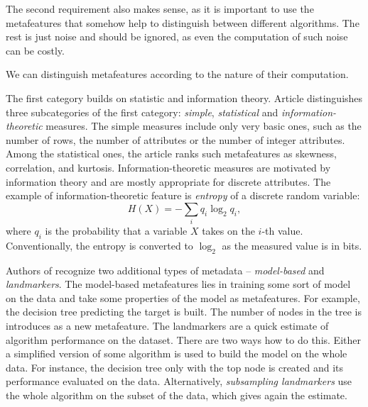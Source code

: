 The second requirement also makes sense, as it is important to use the metafeatures that somehow help to distinguish between different algorithms. The rest is just noise and should be ignored, as even the computation of such noise can be costly.

We can distinguish metafeatures according to the nature of their computation.

The first category builds on statistic and information theory. Article \cite{MethodsForComparisonHenery1994} distinguishes three subcategories of the first category: \emph{simple}, \emph{statistical} and \emph{information-theoretic} measures. The simple measures include only very basic ones, such as the number of rows, the number of attributes or the number of integer attributes. 
Among the statistical ones, the article ranks such metafeatures as skewness, correlation, and kurtosis.
 Information-theoretic measures are motivated by information theory and are mostly appropriate for discrete attributes. The example of information-theoretic feature is \emph{entropy} of a discrete random variable: 
 \begin{equation}
 \label{equation:entropy}
H(X) = - \sum_{i}q_i\log_{2}q_i,
 \end{equation}
where $q_i$ is the probability that a variable $X$ takes on the $i$-th value. Conventionally, the entropy is converted to $\log_{2}$ as the measured value is in bits.

Authors of \cite{BrazdilMetalearning-2009} recognize two additional types of metadata -- \emph{model-based} and \emph{landmarkers}. The model-based metafeatures lies in training some sort of model on the data and take some properties of the model as metafeatures. For example, the decision tree \cite{decisionTrees} predicting the target is built. The number of nodes in the tree is introduces as a new metafeature. The landmarkers are a quick estimate of algorithm performance on the dataset. There are two ways how to do this. Either a simplified version of some algorithm is used to build the model on the whole data. For instance, the decision tree only with the top node is created and its performance evaluated on the data. Alternatively, \emph{subsampling landmarkers} use the whole algorithm on the subset of the data, which gives again the estimate.

